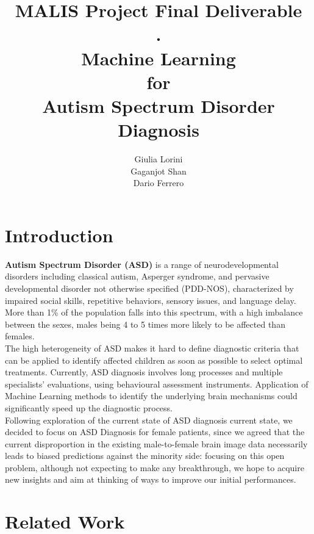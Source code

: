 \documentclass{article}
\title{MALIS Project Final Deliverable\\.\\Machine Learning\\for\\Autism Spectrum Disorder Diagnosis}
\author{
Giulia Lorini\\
Gaganjot Shan\\
Dario Ferrero\\
}
\begin{document}
\maketitle

\section{Introduction}

\textbf{Autism Spectrum Disorder (ASD)} is a range of neurodevelopmental disorders including classical autism, Asperger syndrome, and pervasive developmental disorder not otherwise specified (PDD-NOS), characterized by impaired social skills, repetitive behaviors, sensory issues, and language delay. More than 1\% of the population falls into this spectrum, with a high imbalance between the sexes, males being 4 to 5 times more likely to be affected than females\cite{defautism}.\\

The high heterogeneity of ASD makes it hard to define diagnostic criteria that can be applied to identify affected children as soon as possible to select optimal treatments. Currently, ASD diagnosis involves long processes and multiple specialists’ evaluations, using behavioural assessment instruments. Application of Machine Learning methods to identify the underlying brain mechanisms could significantly speed up the diagnostic process.\cite{defautism}\cite{abide}\\

Following exploration of the current state of ASD diagnosis current state, we decided to
focus on ASD Diagnosis for female patients, since we agreed that the current disproportion in
the existing male-to-female brain image data necessarily leads to biased predictions against the
minority side: focusing on this open problem, although not expecting to make any breakthrough,
we hope to acquire new insights and aim at thinking of ways to improve our initial performances.


\section{Related Work}

\end{document}
